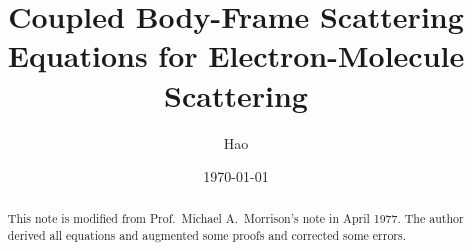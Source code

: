 \documentclass[aps,pra,groupedaddress,12pt,
               amsfonts,amssymb,
               preprint
    ]{revtex4}
\begin{document}
%
\date{\today}
%
\title[Coupled Body-Frame Scattering Equations for Electron-Molecule Scattering]%
{Coupled Body-Frame Scattering Equations for Electron-Molecule Scattering}

\author{Hao }

\begin{abstract}
  This note is modified from Prof.~Michael A.~Morrison's note in
  April 1977. The author derived all equations and augmented some proofs
  and corrected some errors.
\end{abstract}

\maketitle
\tableofcontents
\end{document}
